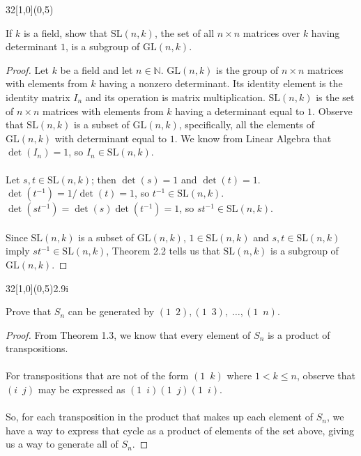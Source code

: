 \documentclass[12pt]{article}
\newenvironment{exercise}[2]{\begin{textblock}{32}[1,0](0,#2)\noindent#1\end{textblock}}{\vspace{1in}}
\begin{document}
\begin{exercise}{2.2}{5}
	{\noindent}If $k$ is a field, show that $\text{SL}(n,k)$, the set of all $n\times n$ matrices over $k$ having determinant $1$, is a subgroup of $\text{GL}(n,k)$.
	\bigskip
	\begin{proof}
		Let $k$ be a field and let $n\in\mathbb{N}$. $\text{GL}(n,k)$ is the group of $n\times n$ matrices with elements from $k$ having a nonzero determinant. Its identity element is the identity matrix $I_n$ and its operation is matrix multiplication.
		$\text{SL}(n,k)$ is the set of $n\times n$ matrices with elements from $k$ having a determinant equal to $1$. Observe that $\text{SL}(n,k)$ is a subset of $\text{GL}(n,k)$, specifically, all the elements of $\text{GL}(n,k)$ with determinant equal to $1$.
		We know from Linear Algebra that $\det(I_n)=1$, so $I_n\in \text{SL}(n,k)$.\\
		\\
		Let $s,t\in\text{SL}(n,k)$; then $\det(s)=1$ and $\det(t)=1$. $\det(t^{-1})=1/\det(t)=1$, so $t^{-1}\in\text{SL}(n,k)$.
		$\det(st^{-1})=\det(s)\det(t^{-1})=1$, so $st^{-1}\in\text{SL}(n,k)$.\\
		\\
		Since $\text{SL}(n,k)$ is a subset of $\text{GL}(n,k)$, $1\in \text{SL}(n,k)$ and $s, t\in \text{SL}(n,k)$ imply $st^{-1}\in\text{SL}(n,k)$, Theorem 2.2 tells us that $\text{SL}(n,k)$ is a subgroup of $\text{GL}(n,k)$.
	\end{proof}
\end{exercise}

\begin{exercise}{2.9i}{5}
	{\noindent}Prove that $S_n$ can be generated by $(1\enspace 2), (1\enspace 3),\;\dotsc, (1\enspace n)$.
	\bigskip
	\begin{proof}
		From Theorem 1.3, we know that every element of $S_n$ is a product of transpositions.\\
		\\
		For transpositions that are not of the form $(1\enspace k)$ where $1<k\leq n$, observe that $(i\enspace j)$ may be expressed as $(1\enspace i)(1\enspace j)(1\enspace i)$.\\
		\\
		So, for each transposition in the product that makes up each element of $S_n$, we have a way to express that cycle as a product of elements of the set above, giving us a way to generate all of $S_n$.
	\end{proof}
\end{exercise}
\end{document}
